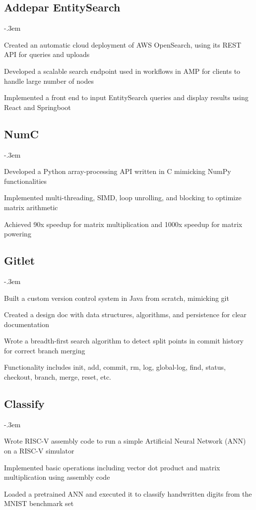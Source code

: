 \documentclass{article}
\let\olditemize=\itemize \let\endolditemize=\enditemize
\renewenvironment{itemize}{\olditemize[topsep=0em] \itemsep-.3em}{\endolditemize}
\begin{document}
\subsection{Addepar EntitySearch}
\begin{itemize}
  \item Created an automatic cloud deployment of AWS OpenSearch, using its REST API for queries and uploads
  \item Developed a scalable search endpoint used in workflows in AMP for clients to handle large number of nodes
  \item Implemented a front end to input EntitySearch queries and display results using React and Springboot
\end{itemize}

\subsection{NumC}
\begin{itemize}
  \item Developed a Python array-processing API written in C mimicking NumPy functionalities
  \item Implemented multi-threading, SIMD, loop unrolling, and blocking to optimize matrix arithmetic
  \item Achieved 90x speedup for matrix multiplication and 1000x speedup for matrix powering
\end{itemize}

\subsection{Gitlet}
\begin{itemize}
  \item Built a custom version control system in Java from scratch, mimicking git
  \item Created a design doc with data structures, algorithms, and persistence for clear documentation
  \item Wrote a breadth-first search algorithm to detect split points in commit history for correct branch merging
  \item Functionality includes init, add, commit, rm, log, global-log, find, status, checkout, branch, merge, reset, etc.
\end{itemize}

\subsection{Classify}
\begin{itemize}
  \item Wrote RISC-V assembly code to run a simple Artificial Neural Network (ANN) on a RISC-V simulator
  \item Implemented basic operations including vector dot product and matrix multiplication using assembly code
  \item Loaded a pretrained ANN and executed it to classify handwritten digits from the MNIST benchmark set
\end{itemize}
\end{document}
